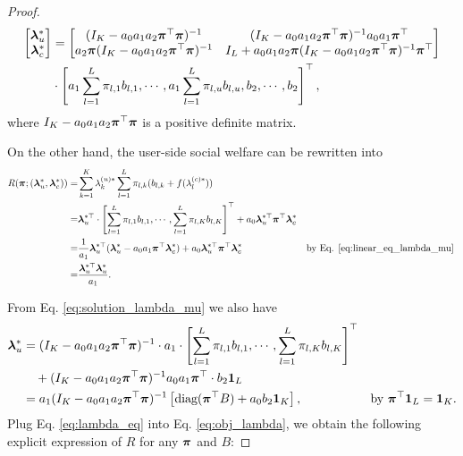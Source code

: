 \begin{proof}
\begin{align}\notag
   \begin{bmatrix}
        \bm{\lambda}_u^*  \\
        \bm{\lambda}_c^*
\end{bmatrix}&=\begin{bmatrix}
        (I_K-a_0a_1a_2\bm{\pi}^{\top}\bm{\pi})^{-1} & (I_K-a_0a_1a_2\bm{\pi}^{\top}\bm{\pi})^{-1}a_0a_1\bm{\pi}^{\top}\\
        a_2\bm{\pi}(I_K-a_0a_1a_2\bm{\pi}^{\top}\bm{\pi})^{-1} & I_L+a_0a_1a_2\bm{\pi}(I_K-a_0a_1a_2\bm{\pi}^{\top}\bm{\pi})^{-1}\bm{\pi}^{\top}
\end{bmatrix} \\ \label{eq:solution_lambda_mu}
&\cdot\left[a_1\sum_{l=1}^L\pi_{l,1}b_{l,1},\cdots,a_1\sum_{l=1}^L\pi_{l,u}b_{l,u},b_2,\cdots,b_2\right]^{\top},
\end{align}
where $I_K-a_0a_1a_2\bm{\pi}^{\top}\bm{\pi}$ is a positive definite matrix. 

On the other hand, the user-side social welfare can be rewritten into 
\begin{align}\notag
     R(\bm{\pi}; (\bm{\lambda}_u^*,\bm{\lambda}_c^*))=&\sum_{k=1}^{K} \lambda_{k}^{(u)*} \sum_{l=1}^{L} \pi_{l,k} (b_{l,k} + f(\lambda_l^{(c)*})) \\ \notag
    = & \bm{\lambda}_u^{*\top}\cdot\left[\sum_{l=1}^L\pi_{l,1}b_{l,1},\cdots,\sum_{l=1}^L\pi_{l,K}b_{l,K}\right]^{\top}+a_0\bm{\lambda}_u^{*\top}\bm{\pi}^{\top}\bm{\lambda}_c^* \\ \notag
    = &  \frac{1}{a_1}\bm{\lambda}_u^{*\top}(\bm{\lambda}_u^*-a_0a_1\bm{\pi}^{\top}\bm{\lambda}_c^*) + a_0\bm{\lambda}_u^{*\top}\bm{\pi}^{\top}\bm{\lambda}_c^* & \mbox{by Eq. \eqref{eq:linear_eq_lambda_mu} } \\ \label{eq:obj_lambda}
    =&\frac{\bm{\lambda}_u^{*\top}\bm{\lambda}_u^*}{a_1}.
\end{align}

From Eq. \eqref{eq:solution_lambda_mu} we also have 
\begin{align}\notag
    \bm{\lambda}_u^{*}&=(I_K-a_0a_1a_2\bm{\pi}^{\top}\bm{\pi})^{-1} 
\cdot a_1 \cdot \left[\sum_{l=1}^L \pi_{l,1}b_{l,1}, \cdots, \sum_{l=1}^L \pi_{l,K}b_{l,K}\right]^{\top}  \\ \notag
    &\quad + (I_K-a_0a_1a_2\bm{\pi}^{\top}\bm{\pi})^{-1} a_0 a_1 \bm{\pi}^{\top} \cdot b_2 \bm{1}_L \\\label{eq:lambda_eq}
    &= a_1(I_K - a_0 a_1 a_2 \bm{\pi}^{\top} \bm{\pi})^{-1} \left[\text{diag}(\bm{\pi}^{\top}B) + a_0 b_2 \bm{1}_K\right], & \text{by } \bm{\pi}^{\top} \bm{1}_L = \bm{1}_K.
\end{align}
Plug Eq. \eqref{eq:lambda_eq} into Eq. \eqref{eq:obj_lambda}, we obtain the following explicit expression of $R$ for any $\bm{\pi}$ and $B$:


\end{proof}

